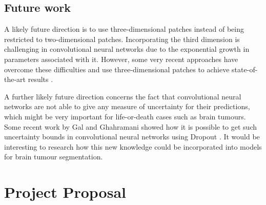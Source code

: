 \documentclass[12pt,a4paper,twoside,openright]{report}
\begin{document}
\section{Future work}
A likely future direction is to use three-dimensional patches instead of being restricted to two-dimensional patches. Incorporating the third dimension is challenging in convolutional neural networks due to the exponential growth in parameters associated with it. However, some very recent approaches have overcome these difficulties and use three-dimensional patches to achieve state-of-the-art results \cite{kamnitsas}. 

A further likely future direction concerns the fact that convolutional neural networks are not able to give any measure of uncertainty for their predictions, which might be very important for life-or-death cases such as brain tumours. Some recent work by Gal and Ghahramani showed how it is possible to get such uncertainty bounds in convolutional neural networks using Dropout \cite{Gal2015Dropout}. It would be interesting to research how this new knowledge could be incorporated into models for brain tumour segmentation.



\appendix

%
%


\chapter{Project Proposal}


\end{document}
